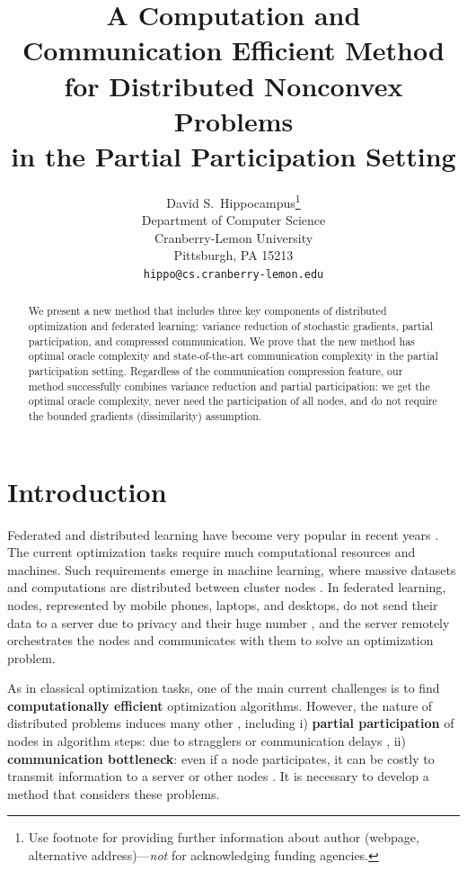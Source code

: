 \documentclass{article}
\title{A Computation and Communication Efficient Method for Distributed Nonconvex Problems \\ in the Partial Participation Setting}
\author{%
  David S.~Hippocampus\thanks{Use footnote for providing further information
    about author (webpage, alternative address)---\emph{not} for acknowledging
    funding agencies.} \\
  Department of Computer Science\\
  Cranberry-Lemon University\\
  Pittsburgh, PA 15213 \\
  \texttt{hippo@cs.cranberry-lemon.edu} \\
}
\begin{document}
\maketitle


\begin{abstract}
  We present a new method that includes three key components of distributed optimization and federated learning: variance reduction of stochastic gradients, partial participation, and compressed communication. We prove that the new method has optimal oracle complexity and state-of-the-art communication complexity in the partial participation setting. Regardless of the communication compression feature, our method successfully combines variance reduction and partial participation: we get the optimal oracle complexity, never need the participation of all nodes, and do not require the bounded gradients (dissimilarity) assumption.
\end{abstract}

\section{Introduction}
Federated and distributed learning have become very popular in recent years \citep{konevcny2016federated, mcmahan2017communication}. 
The current optimization tasks require much computational resources and machines. Such requirements emerge in machine learning, where massive datasets and computations are distributed between cluster nodes \citep{lin2017deep, ramesh2021zero}. In federated learning, nodes, represented by mobile phones, laptops, and desktops, do not send their data to a server due to privacy and their huge number \citep{ramaswamy2019federated}, and the server remotely orchestrates the nodes and communicates with them to solve an optimization problem.

As in classical optimization tasks, one of the main current challenges is to find \textbf{computationally efficient} optimization algorithms. However, the nature of distributed problems induces many other \citep{kairouz2021advances}, including i) \textbf{partial participation} of nodes in algorithm steps: due to stragglers \citep{li2020federated} or communication delays \citep{vogels2021relaysum}, ii) \textbf{communication bottleneck}: even if a node participates, it can be costly to transmit information to a server or other nodes \citep{alistarh2017qsgd, ramesh2021zero,kairouz2021advances, sapio2019scaling, narayanan2019pipedream}. It is necessary to develop a method that considers these problems.
\end{document}
